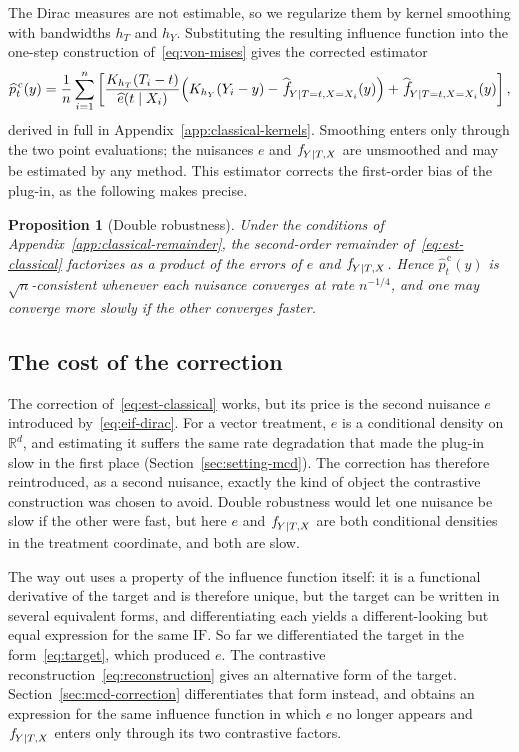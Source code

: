 \documentclass[11pt]{article}
\theoremstyle{plain}
\newtheorem{mypropo}{Proposition}
\theoremstyle{definition}
\theoremstyle{remark}
\newcommand{\R}{\mathbb{R}}
\newcommand{\pf}[1]{\ensuremath{\,\mathlarger{\textit{f}}_{#1}}}
\newcommand{\pfhat}[1]{\ensuremath{\,\mathlarger{\widehat{\textit{f}}}_{#1}}}
\newcommand{\IF}{\mathrm{IF}}
\newcommand{\gps}{e}
\begin{document}
The Dirac measures are not estimable, so we regularize them by kernel smoothing with
bandwidths $h_T$ and $h_Y$. Substituting the resulting influence function into the one-step
construction of~\eqref{eq:von-mises} gives the corrected estimator
\begin{equation}
\widehat p^{\,\mathrm{c}}_t(y)
= \frac{1}{n}\sum_{i=1}^{n}
\left[ \frac{K_{h_T}(T_i-t)}{\widehat\gps(t \mid X_i)}
\Big( K_{h_Y}(Y_i-y) - \pfhat{Y \mid T=t,X=X_i}(y) \Big)
+ \pfhat{Y \mid T=t,X=X_i}(y) \right],
\label{eq:est-classical}
\end{equation}
derived in full in Appendix~\ref{app:classical-kernels}. Smoothing enters only through the
two point evaluations; the nuisances $\gps$ and $\pf{Y\mid T,X}$ are unsmoothed and may be
estimated by any method. This estimator corrects the first-order bias of the plug-in, as
the following makes precise.

\begin{mypropo}[Double robustness]
\label{prop:dr-classical}
Under the conditions of Appendix~\ref{app:classical-remainder}, the second-order remainder
of~\eqref{eq:est-classical} factorizes as a product of the errors of $\gps$ and
$\pf{Y\mid T,X}$. Hence $\widehat p^{\,\mathrm{c}}_t(y)$ is $\sqrt{n}$-consistent whenever
each nuisance converges at rate $n^{-1/4}$, and one may converge more slowly if the other
converges faster.
\end{mypropo}

\subsection{The cost of the correction}
\label{sec:eif-cost}

The correction of~\eqref{eq:est-classical} works, but its price is the second nuisance
$\gps$ introduced by~\eqref{eq:eif-dirac}. For a vector treatment, $\gps$ is a conditional
density on $\R^{d}$, and estimating it suffers the same rate degradation that made the
plug-in slow in the first place (Section~\ref{sec:setting-mcd}). The correction has
therefore reintroduced, as a second nuisance, exactly the kind of object the contrastive
construction was chosen to avoid. Double robustness would let one nuisance be slow if the
other were fast, but here $\gps$ and $\pf{Y\mid T,X}$ are both conditional densities in the
treatment coordinate, and both are slow.

The way out uses a property of the influence function itself: it is a functional derivative
of the target and is therefore unique, but the target can be written in several equivalent
forms, and differentiating each yields a different-looking but equal expression for the
same $\IF$. So far we differentiated the target in the form~\eqref{eq:target}, which
produced $\gps$. The contrastive reconstruction~\eqref{eq:reconstruction} gives an
alternative form of the target. Section~\ref{sec:mcd-correction} differentiates that form
instead, and obtains an expression for the same influence function in which $\gps$ no
longer appears and $\pf{Y\mid T,X}$ enters only through its two contrastive factors.
\end{document}
